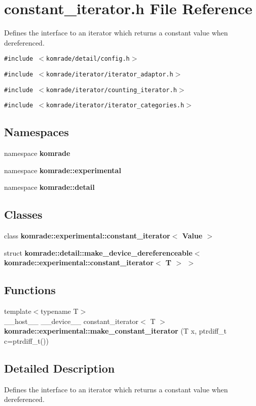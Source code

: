 \section{constant\_\-iterator.h File Reference}
\label{constant__iterator_8h}
Defines the interface to an iterator which returns a constant value when dereferenced. 

{\tt \#include $<$komrade/detail/config.h$>$}\par
{\tt \#include $<$komrade/iterator/iterator\_\-adaptor.h$>$}\par
{\tt \#include $<$komrade/iterator/counting\_\-iterator.h$>$}\par
{\tt \#include $<$komrade/iterator/iterator\_\-categories.h$>$}\par
\subsection*{Namespaces}
\begin{CompactItemize}
\item 
namespace {\bf komrade}
\item 
namespace {\bf komrade::experimental}
\item 
namespace \textbf{komrade::detail}
\end{CompactItemize}
\subsection*{Classes}
\begin{CompactItemize}
\item 
class \textbf{komrade::experimental::constant\_\-iterator$<$ Value $>$}
\item 
struct \textbf{komrade::detail::make\_\-device\_\-dereferenceable$<$ komrade::experimental::constant\_\-iterator$<$ T $>$ $>$}
\end{CompactItemize}
\subsection*{Functions}
\begin{CompactItemize}
\item 
{\footnotesize template$<$typename T$>$ }\\\_\-\_\-host\_\-\_\- \_\-\_\-device\_\-\_\- constant\_\-iterator$<$ T $>$ \textbf{komrade::experimental::make\_\-constant\_\-iterator} (T x, ptrdiff\_\-t c=ptrdiff\_\-t())\label{namespacekomrade_1_1experimental_ee459d0d41235d9c3cf69258fc873d57}

\end{CompactItemize}


\subsection{Detailed Description}
Defines the interface to an iterator which returns a constant value when dereferenced. 


